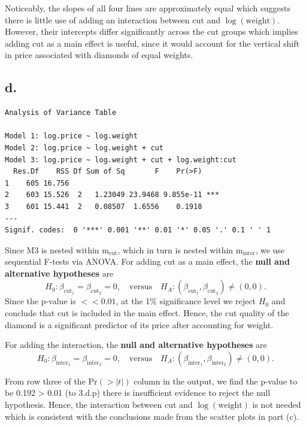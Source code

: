 \documentclass[
  11pt,
]{article}
\begin{document}
Noticeably, the slopes of all four lines are approximately equal which
suggests there is little use of adding an interaction between cut and
\(\log(\text{weight})\). However, their intercepts differ significantly
across the cut groups which implies adding cut as a main effect is
useful, since it would account for the vertical shift in price
associated with diamonds of equal weights.

\subsection{d.~}\label{d.-1}

\begin{verbatim}
Analysis of Variance Table

Model 1: log.price ~ log.weight
Model 2: log.price ~ log.weight + cut
Model 3: log.price ~ log.weight + cut + log.weight:cut
  Res.Df    RSS Df Sum of Sq       F    Pr(>F)    
1    605 16.756                                   
2    603 15.526  2   1.23049 23.9468 9.855e-11 ***
3    601 15.441  2   0.08507  1.6556    0.1918    
---
Signif. codes:  0 '***' 0.001 '**' 0.01 '*' 0.05 '.' 0.1 ' ' 1
\end{verbatim}

Since M3 is nested within \(\text{m}_{\text{cut}}\), which in turn is
nested within \(\text{m}_{\text{inter}}\), we use sequential F-tests via
ANOVA. For adding cut as a main effect, the \textbf{null and alternative
hypotheses} are \[
H_0: \beta_{\text{cut}_1} = \beta_{\text{cut}_2} = 0, \quad \text{versus} \quad H_A: (\beta_{\text{cut}_1}, \beta_{\text{cut}_2}) \neq (0, 0). 
\] Since the p-value is \(<<0.01\), at the 1\% significance level we
reject \(H_0\) and conclude that cut is included in the main effect.
Hence, the cut quality of the diamond is a significant predictor of its
price after accounting for weight.

For adding the interaction, the \textbf{null and alternative hypotheses}
are \[
H_0: \beta_{\text{inter}_1} = \beta_{\text{inter}_2} = 0, \quad \text{versus} \quad H_A: (\beta_{\text{inter}_1}, \beta_{\text{inter}_2}) \neq (0, 0). 
\]

From row three of the \(\text{Pr}(>|t|)\) column in the output, we find
the p-value to be 0.192 \textgreater{} 0.01 (to 3.d.p) there is
insufficient evidence to reject the null hypothesis. Hence, the
interaction between cut and \(\log(\text{weight})\) is not needed which
is consistent with the conclusions made from the scatter plots in part
(c).
\end{document}
